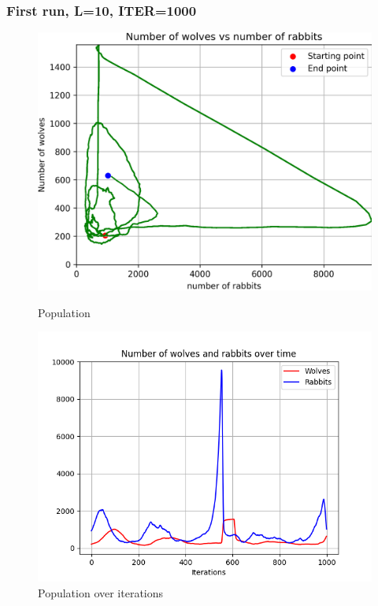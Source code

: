 \documentclass[unicode,11pt,a4paper,oneside,numbers=endperiod,openany]{scrartcl}
\begin{document}
\subsubsection*{First run, L=10, ITER=1000}
\begin{figure}[H]
  \centering
  \begin{minipage}[b]{0.435\textwidth}
    \centering
    \includegraphics[width=\textwidth]{output_main/Bestnew_populations.png}
    \caption{Population}
  \end{minipage}
  \hfill
  \begin{minipage}[b]{0.49\textwidth}
    \centering
    \includegraphics[width=\textwidth]{output_main/Bestnew.png}
    \caption{Population over iterations}
  \end{minipage}
\end{figure}
\end{document}
